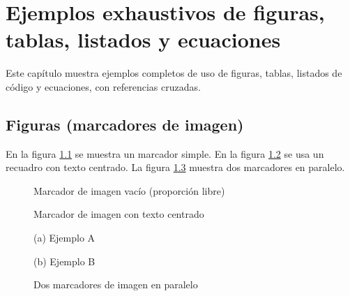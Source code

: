 \chapter{Ejemplos exhaustivos de figuras, tablas, listados y ecuaciones}

Este capítulo muestra ejemplos completos de uso de figuras, tablas, listados de código y ecuaciones, con referencias cruzadas.

\section{Figuras (marcadores de imagen)}
En la figura \ref{fig:placeholder1} se muestra un marcador simple. En la figura \ref{fig:placeholder2} se usa un recuadro con texto centrado. La figura \ref{fig:placeholder-side-by-side} muestra dos marcadores en paralelo.

\begin{figure}[htbp]
  \centering
  \fbox{\rule{0pt}{6cm}\rule{0.9\textwidth}{0pt}}
  \caption{Marcador de imagen vacío (proporción libre)}
  \label{fig:placeholder1}
\end{figure}

\begin{figure}[htbp]
  \centering
  \caption{Marcador de imagen con texto centrado}
  \label{fig:placeholder2}
\end{figure}

\begin{figure}[htbp]
  \centering
  \begin{minipage}{0.48\textwidth}
    \centering
    \fbox{\rule{0pt}{4cm}\rule{0.95\textwidth}{0pt}}
    \par (a) Ejemplo A
  \end{minipage}\hfill
  \begin{minipage}{0.48\textwidth}
    \centering
    \fbox{\rule{0pt}{4cm}\rule{0.95\textwidth}{0pt}}
    \par (b) Ejemplo B
  \end{minipage}
  \caption{Dos marcadores de imagen en paralelo}
  \label{fig:placeholder-side-by-side}
\end{figure}

